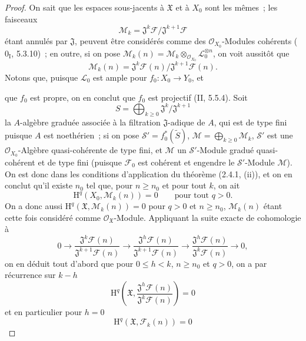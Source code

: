 \begin{proof}
On sait que les espaces sous-jacents à $\mathfrak X$ et à $X_0$ sont les mêmes~;
les faisceaux
\[
\mathcal M_k=\mathfrak J^k\mathcal F/\mathfrak J^{k+1}\mathcal F
\]
étant annulés par $\mathfrak J$, peuvent être considérés comme des
$\mathcal O_{X_0}$-Modules cohérents ($0_{\mathrm I}$, 5.3.10)~; en outre, si on
pose $\mathcal M_k(n)=\mathcal M_k\otimes_{\mathcal O_{X_0}}
\mathcal L_0^{\otimes n}$, on voit aussitôt que
\[
\mathcal M_k(n)=\mathfrak J^k\mathcal F(n)/
\mathfrak J^{k+1}\mathcal F(n).
\]
Notons que, puisque $\mathcal L_0$ est ample pour $f_0:X_0\to Y_0$, et


que $f_0$ est propre, on en conclut que $f_0$ est projectif (II, 5.5.4). Soit
\[
S=\bigoplus_{k\geq0}\mathfrak J^k/\mathfrak J^{k+1}
\]
la $A$-algèbre graduée associée à la filtration $\mathfrak J$-adique de $A$, qui est
de type fini puisque $A$ est noethérien~; si on pose
$\mathcal S'=f_0^*(\widetilde S)$,
$\mathcal M=\bigoplus_{k\geq0}\mathcal M_k$, $\mathcal S'$ est une
$\mathcal O_{X_0}$-Algèbre quasi-cohérente de type fini, et $\mathcal M$ un
$\mathcal S'$-Module gradué quasi-cohérent et de type fini (puisque $\mathcal F_0$
est cohérent et engendre le $\mathcal S'$-Module $\mathcal M$). On est donc dans les
conditions d'application du théorème (2.4.1, (ii)), et on en conclut qu'il existe
$n_0$ tel que, pour $n\geq n_0$ et pour tout $k$, on ait
\begin{equation}
\mathrm H^q(X_0,\mathcal M_k(n))=0\qquad\text{pour tout }q>0.
\tag{5.2.3.1}
\label{III.5.2.3.1-fr}
\end{equation}
On a donc aussi $\mathrm H^q(\mathfrak X,\mathcal M_k(n))=0$ pour $q>0$ et
$n\geq n_0$, $\mathcal M_k(n)$ étant cette fois considéré comme
$\mathcal O_{\mathfrak X}$-Module. Appliquant la suite exacte de cohomologie à
\[
0\to
\frac{\mathfrak J^k\mathcal F(n)}{\mathfrak J^{k+1}\mathcal F(n)}
\to
\frac{\mathfrak J^h\mathcal F(n)}{\mathfrak J^{k+1}\mathcal F(n)}
\to
\frac{\mathfrak J^h\mathcal F(n)}{\mathfrak J^k\mathcal F(n)}
\to0,
\]
on en déduit tout d'abord que pour $0\leq h<k$, $n\geq n_0$ et $q>0$, on a par
récurrence sur $k-h$
\begin{equation}
\mathrm H^q\left(\mathfrak X,
\frac{\mathfrak J^h\mathcal F(n)}{\mathfrak J^k\mathcal F(n)}\right)=0
\tag{5.2.3.2}
\label{III.5.2.3.2-fr}
\end{equation}
et en particulier pour $h=0$
\begin{equation}
\mathrm H^q(\mathfrak X,\mathcal F_k(n))=0

\end{equation}
\end{proof}
